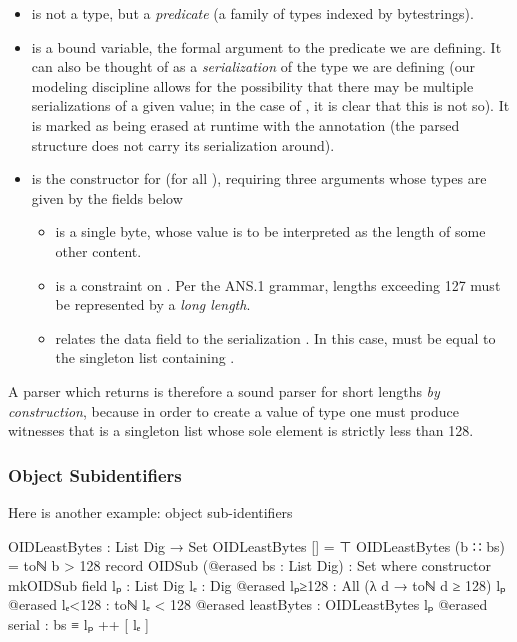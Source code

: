\documentclass[11pt]{article}
\begin{document}
\begin{itemize}
\item {} is not a type, but a \emph{predicate} (a family of types
indexed by bytestrings).
\item {} is a bound variable, the formal argument to the predicate we
are defining.
It can also be thought of as a \emph{serialization} of the type we are
defining (our modeling discipline allows for the possibility that there may
be multiple serializations of a given value; in the case of
, it is clear that this is not so).
It is marked as being erased at runtime with the 
annotation (the parsed structure does not carry its serialization around).
\item {} is the constructor for
\AgdaSpace{} (for all ),
requiring three arguments whose types are given by the fields below
\begin{itemize}
\item {} is a single byte, whose value is to be interpreted as the
length of some other content.

\item {} is a constraint on . Per the ANS.1 grammar,
lengths exceeding 127 must be represented by a \emph{long length}.

\item {} relates the data field  to the serialization
.
In this case,  must be equal to the singleton list
containing .
\end{itemize}
\end{itemize}


A parser which returns \AgdaSpace{} is
therefore a sound parser for short lengths \emph{by construction}, because in order
to create a value of type \AgdaSpace{} one
must produce witnesses that  is a singleton list whose sole
element is strictly less than 128.

\subsubsection{Object Subidentifiers}
\label{sec:org4857360}
Here is another example: object sub-identifiers

\begin{code}
OIDLeastBytes : List Dig → Set
OIDLeastBytes [] = ⊤
OIDLeastBytes (b  ∷ bs) = toℕ b > 128
record OIDSub (@erased bs : List Dig) : Set where
  constructor mkOIDSub
  field
    lₚ : List Dig
    lₑ : Dig
    @erased lₚ≥128 : All (λ d → toℕ d ≥ 128) lₚ
    @erased lₑ<128 : toℕ lₑ < 128
    @erased leastBytes : OIDLeastBytes lₚ
    @erased serial : bs ≡ lₚ ++ [ lₑ ]
\end{code}
\end{document}
